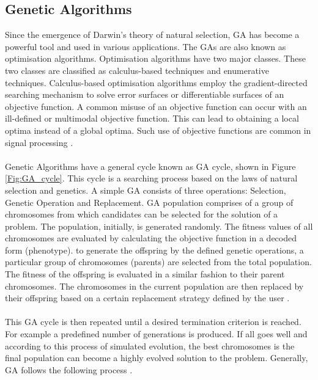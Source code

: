 \documentclass[a4paper, 11pt]{article}
\begin{document}
    \subsection{Genetic Algorithms}\label{sec:bg_sub2}
    Since the emergence of Darwin's theory of natural selection, GA has become a powerful tool and used in various
    applications.  The GAs are also known as optimisation algorithms. Optimisation algorithms have two major classes.
    These two classes are classified as calculus-based techniques and enumerative techniques. Calculus-based
    optimisation algorithms employ the gradient-directed searching mechanism to solve error surfaces or differentiable
    surfaces of an objective function. A common misuse of an objective function can occur with an ill-defined or multimodal
    objective function. This can lead to obtaining a local optima instead of a global optima. Such use of objective
    functions are common in signal processing \cite{Tang1996}.
    \\\\
    Genetic Algorithms have a general cycle known as GA cycle, shown in Figure \ref{Fig:GA_cycle}. This cycle is a searching
    process  based on the laws of natural selection and genetics. A simple GA consists of three operations: Selection, Genetic
    Operation and Replacement. GA population comprises of a group of chromosomes from which candidates can be selected for the
    solution of a problem. The population, initially, is generated randomly. The fitness values of all chromosomes are 
    evaluated by calculating the objective function in a decoded form (phenotype). to generate the offspring by the defined 
    genetic operations, a particular group of chromosomes (parents) are selected from the total population. The fitness of the 
    offspring is evaluated in a similar fashion to their parent chromosomes. The chromosomes in the current population are then 
    replaced by their offspring based on a certain replacement strategy defined by the user \cite{Tang1996}.
    \\\\
    This GA cycle is then repeated until a desired termination criterion is reached. For example a predefined number of generations
    is produced. If all goes well and according to this process of simulated evolution, the best chromosomes is the final population 
    can become a highly evolved solution to the problem. Generally, GA follows the following process \cite{Tang1996}.
\end{document}
